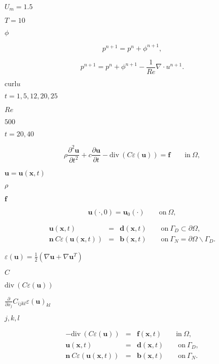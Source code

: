 \documentclass{article}
\begin{document}
$U_m = 1.5$
\pagebreak

$T=10$
\pagebreak

$\phi$
\pagebreak

\[ p^{n+1} = p^n + \phi^{n+1}, \]
\pagebreak

\[ p^{n+1} = p^n + \phi^{n+1} - \frac{1}{Re} \nabla\cdot u^{n+1}. \]
\pagebreak

$\text{curl} u$
\pagebreak

$t=1,5,12,20,25$
\pagebreak

$Re$
\pagebreak

$500$
\pagebreak

$t=20,40$
\pagebreak

\[ \rho \frac{\partial^2 \mathbf{u}}{\partial t^2} + c \frac{\partial \mathbf{u}}{\partial t} - \textrm{div}\ ( C \varepsilon(\mathbf{u})) = \mathbf{f} \qquad \textrm{in}\ \Omega, \]
\pagebreak

$\mathbf{u}=\mathbf{u} (\mathbf{x},t)$
\pagebreak

$\rho$
\pagebreak

$\mathbf{f}$
\pagebreak

\[ \mathbf{u}(\cdot, 0) = \mathbf{u}_0(\cdot) \qquad \textrm{on}\ \Omega, \]
\pagebreak

\begin{eqnarray*} \mathbf{u}(\mathbf{x},t) &=& \mathbf{d}(\mathbf{x},t) \qquad \textrm{on}\ \Gamma_D\subset\partial\Omega, \\ \mathbf{n} \ C \varepsilon(\mathbf{u}(\mathbf{x},t)) &=& \mathbf{b}(\mathbf{x},t) \qquad \textrm{on}\ \Gamma_N=\partial\Omega\backslash\Gamma_D. \end{eqnarray*}
\pagebreak

$\varepsilon(\mathbf{u})= \frac 12 (\nabla \mathbf{u} + \nabla \mathbf{u}^T)$
\pagebreak

$C$
\pagebreak

$\textrm{div}\ ( C \varepsilon(\mathbf{u}))$
\pagebreak

$\frac \partial{\partial x_j} C_{ijkl} \varepsilon(\mathbf{u})_{kl}$
\pagebreak

$j,k,l$
\pagebreak

\begin{eqnarray*} - \textrm{div}\ ( C \varepsilon(\mathbf{u})) &=& \mathbf{f}(\mathbf{x},t) \qquad \textrm{in}\ \Omega, \\ \mathbf{u}(\mathbf{x},t) &=& \mathbf{d}(\mathbf{x},t) \qquad \textrm{on}\ \Gamma_D, \\ \mathbf{n} \ C \varepsilon(\mathbf{u}(\mathbf{x},t)) &=& \mathbf{b}(\mathbf{x},t) \qquad \textrm{on}\ \Gamma_N. \end{eqnarray*}
\pagebreak
\end{document}
